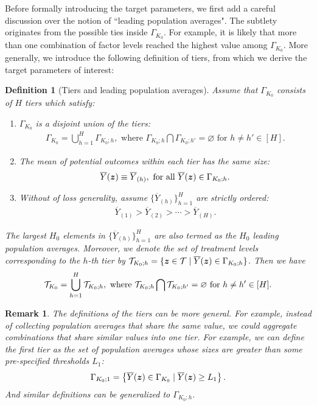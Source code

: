\documentclass[12pt]{article}
\newtheorem{definition}{Definition}
\newtheorem{remark}{Remark}
\begin{document}
Before formally introducing the target parameters, we first add a careful discussion over the notion of ``leading population averages". The subtlety originates from the possible ties inside $\Gamma_{K_0}$. For example,  it is likely that more than one combination of factor levels reached the highest value among $\Gamma_{K_0}$. More generally, we introduce the following definition of tiers, from which we derive the target parameters of interest:
\begin{definition}[Tiers and leading population averages]\label{def:tiers}
Assume that $\Gamma_{K_0}$ consists of $H$ tiers which satisfy:
\begin{enumerate}
\item $\Gamma_{K_0}$ is a disjoint union of the tiers:
\begin{align*}
    \Gamma_{K_0} = \bigcup_{h=1}^H \Gamma_{K_0;h}, \text{ where } \Gamma_{K_0;h} \bigcap \Gamma_{K_0;h'} = \varnothing \text{ for } h\neq h' \in [H]. 
\end{align*}

\item The mean of potential outcomes within each tier has the same size:
\begin{align*}
    \overline{Y}({\boldsymbol{z}}) \equiv \overline{Y}_{(h)}, \text{ for all  }\overline{Y}({\boldsymbol{z}}) \in \Gamma_{K_0;h}.
\end{align*}

\item Without of loss generality, assume $\{\overline{Y}_{(h)}\}_{h=1}^H$ are strictly ordered:
\begin{align*}
    \overline{Y}_{(1)} > \overline{Y}_{(2)} > \cdots > \overline{Y}_{(H)}.
\end{align*}
\end{enumerate}
The largest $H_0$ elements in $\{\overline{Y}_{(h)}\}_{h=1}^H$ are also termed as the $H_0$ leading population averages. Moreover, we denote the set of treatment levels corresponding to the $h$-th tier by ${\mathcal{T}}_{K_0;h} = \{{\boldsymbol{z}}\in{\mathcal{T}} \mid \overline{Y}({\boldsymbol{z}}) \in \Gamma_{K_0;h}\}$. Then we have
\begin{align*}
    {\mathcal{T}}_{K_0} = \bigcup_{h=1}^H {\mathcal{T}}_{K_0;h}, \text{ where } {\mathcal{T}}_{K_0;h} \bigcap {\mathcal{T}}_{K_0;h'} = \varnothing \text{ for } h\neq h' \in [H]. 
\end{align*}
\end{definition}



\begin{remark}
The definitions of the tiers can be more general. For example, instead of collecting population averages that share the \emph{same} value, we could aggregate combinations that share \emph{similar} values into one tier. For example, we can define the first tier as the set of population averages whose sizes are greater than some pre-specified thresholds $L_1$:
\begin{align*}
    \Gamma_{K_0;1} = \left\{\overline{Y}({\boldsymbol{z}})\in\Gamma_{K_0}\mid \overline{Y}({\boldsymbol{z}})\ge L_1\right\}. 
\end{align*}
And similar definitions can be generalized to $\Gamma_{K_0;h}$.
\end{remark}
\end{document}

